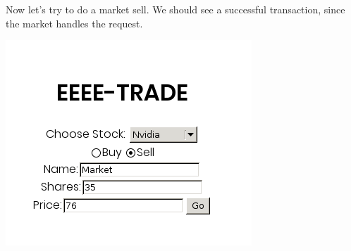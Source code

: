 Now let's try to do a market sell. We should see a successful transaction, since the market handles the request.

 
\includegraphics[scale=0.5]{../test15.png}
 